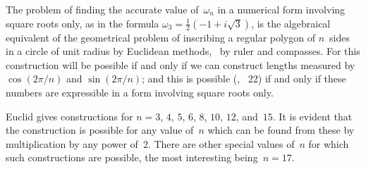 The problem of finding the accurate value of~$\omega_{n}$ in a numerical form
involving square roots only, as in the formula $\omega_{3} = \frac{1}{2}(-1 + i\sqrt{3})$, is the
algebraical equivalent of the geometrical problem of inscribing a regular
polygon of $n$~sides in a circle of unit radius by Euclidean methods, \ie\ by ruler
and compasses. For this construction will be possible if and only if we can
construct lengths measured by $\cos(2\pi/n)$ and $\sin(2\pi/n)$; and this is possible
(, ~22) if and only if these numbers are expressible in a form
involving square roots only.

Euclid gives constructions for $n = 3$, $4$, $5$, $6$, $8$, $10$, $12$, and~$15$. It is
evident that the construction is possible for any value of~$n$ which can be
found from these by multiplication by any power of~$2$. There are other
special values of~$n$ for which such constructions are possible, the most interesting
being~$n = 17$.
